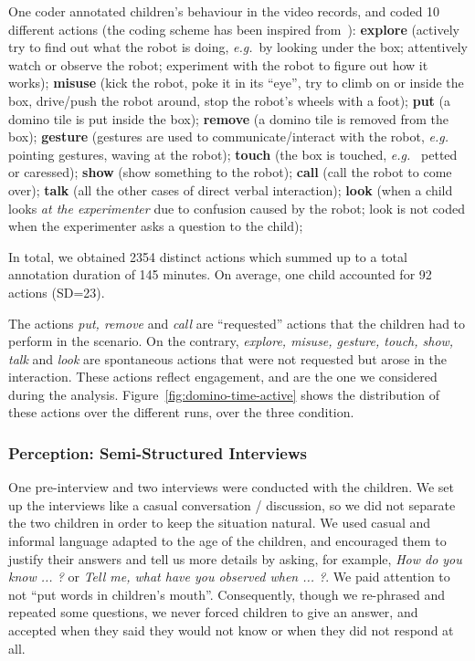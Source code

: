 \documentclass{sig-alternate}
\newcommand{\eg}{{\textit{e.g.~}}}
\begin{document}
One coder annotated children's behaviour in the video records, and coded 10 different
actions (the coding scheme has been inspired from~\cite{fink2014which}):
\textbf{explore} (actively try to find out what the robot is doing, \eg by
looking under the box; attentively watch or observe the robot; experiment with
the robot to figure out how it works); \textbf{misuse} (kick the robot, poke it
in its ``eye'', try to climb on or inside the box, drive/push the robot around,
stop the robot's wheels with a foot); \textbf{put} (a domino tile is put inside
the box); \textbf{remove} (a domino tile is removed from the box);
\textbf{gesture} (gestures are used to communicate/interact with the robot, \eg
pointing gestures, waving at the robot); \textbf{touch} (the box is touched, \eg
petted or caressed); \textbf{show} (show something to the robot); \textbf{call}
(call the robot to come over); \textbf{talk} (all the other cases of direct
verbal interaction); \textbf{look} (when a child looks \emph{at the
experimenter} due to confusion caused by the robot; look is not coded when the
experimenter asks a question to the child);


In total, we obtained 2354 distinct actions which summed up to a total
annotation duration of 145 minutes. On average, one child accounted for 92
actions (SD=23).

The actions \textit{put, remove} and \textit{call} are ``requested'' actions
that the children had to perform in the scenario. On the contrary,
\textit{explore, misuse, gesture, touch, show, talk} and \textit{look} are
spontaneous actions that were not requested but arose in the interaction.  These
actions reflect engagement, and are the one we considered during the analysis.
Figure~\ref{fig:domino-time-active} shows the distribution of these actions over
the different runs, over the three condition.

\subsubsection{Perception: Semi-Structured Interviews}

One pre-interview and two interviews were conducted with the children.  We set
up the interviews like a casual conversation / discussion, so we did not
separate the two children in order to keep the situation natural. We used casual
and informal language adapted to the age of the children, and encouraged them to
justify their answers and tell us more details by asking, for example,
\textit{How do you know ... ?} or \textit{Tell me, what have you observed when
... ?}. We paid attention to not ``put words in children's mouth''.
Consequently, though we re-phrased and repeated some questions, we never forced
children to give an answer, and accepted when they said they would not know or
when they did not respond at all.	
\end{document}
